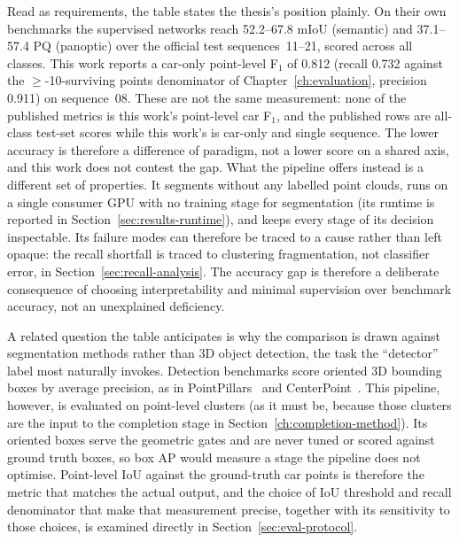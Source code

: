 Read as requirements, the table states the thesis's position plainly. On their own
benchmarks the supervised networks reach \numrange{52.2}{67.8} mIoU (semantic) and
\numrange{37.1}{57.4} PQ (panoptic) over the official test sequences~11--21, scored
across all classes. This work reports a car-only point-level F$_1$ of \num{0.812}
(recall \num{0.732} against the $\ge$-10-surviving points denominator of
Chapter~\ref{ch:evaluation}, precision \num{0.911}) on sequence~08. These are not the
same measurement: none of the published metrics is this work's point-level car F$_1$,
and the published rows are all-class test-set scores while this work's is car-only and
single sequence. The lower accuracy is therefore a difference of paradigm, not a lower
score on a shared axis, and this work does not contest the gap. What the pipeline offers
instead is a different set of properties. It
segments without any labelled point clouds, runs on a single consumer GPU with no training
stage for segmentation (its runtime is reported in Section~\ref{sec:results-runtime}), and keeps every stage of
its decision inspectable. Its
failure modes can therefore be traced to a cause rather than left opaque: the recall
shortfall is traced to clustering fragmentation, not classifier error, in Section~\ref{sec:recall-analysis}.
The accuracy gap is therefore a deliberate consequence of choosing interpretability and
minimal supervision over benchmark accuracy, not an unexplained deficiency.

A related question the table anticipates is why the comparison is drawn against
segmentation methods rather than 3D object detection, the task the ``detector'' label
most naturally invokes. Detection benchmarks score oriented 3D bounding boxes by average
precision, as in PointPillars~\cite{lang2019pointpillars} and
CenterPoint~\cite{yin2021centerpoint}. This pipeline, however, is evaluated on point-level clusters (as it must be, because those
clusters are the input to the completion stage in Section~\ref{ch:completion-method}). Its
oriented boxes serve the geometric gates and are never tuned or scored against ground truth
boxes, so box AP would measure a stage the pipeline does not optimise. Point-level IoU against the ground-truth car points is
therefore the metric that matches the actual output, and the choice of IoU threshold and
recall denominator that make that measurement precise, together with its sensitivity
to those choices, is examined directly in Section~\ref{sec:eval-protocol}.

